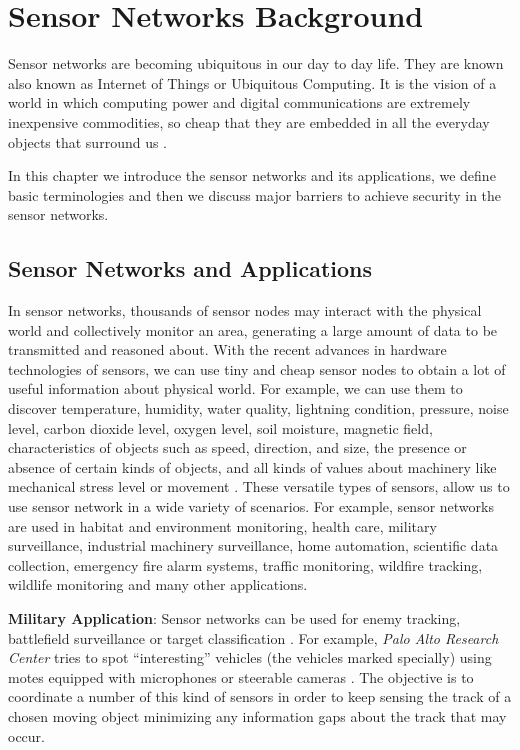 \chapter{Sensor Networks Background} 
\label{cha:Sensor Networks/Data Aggregation/Security Background}
	
	Sensor networks are becoming ubiquitous in our day to day life. 
	They are known also known as Internet of Things or Ubiquitous Computing.
	It is the vision of a world in which computing power and digital communications are extremely inexpensive commodities, so cheap that they are embedded in all the everyday objects that surround us \cite{2002-Stajano-ubiquitous}.
	
	In this chapter we introduce the sensor networks and its applications, we define basic terminologies and then we discuss major 
	barriers to achieve security in the sensor networks.

\section{Sensor Networks and Applications}
	In sensor networks, thousands of sensor nodes may interact with the physical world and collectively monitor an area, generating a large amount of data to be transmitted and reasoned about.
	With the recent advances in hardware technologies of sensors, we can use tiny and cheap sensor nodes to obtain a lot of useful information about physical world.
	For example, we can use them to discover temperature, humidity, water quality, lightning condition, pressure, noise level, carbon dioxide level, oxygen level, soil moisture, magnetic field, characteristics of objects such as speed, direction, and size, the presence or absence of certain kinds of objects, and all kinds of values about machinery like mechanical stress level or movement \cite{hof2007applications}.
	These versatile types of sensors, allow us to use sensor network in a wide variety of scenarios.
	For example, sensor networks are used in habitat and environment monitoring, health care, military surveillance, industrial machinery surveillance, home automation, scientific data collection, emergency fire alarm systems, traffic monitoring, wildfire tracking, wildlife monitoring and many other applications.
	
	\textbf{Military Application}: 
		Sensor networks can be used for enemy tracking, battlefield surveillance or target classification \cite{li2002detection}.
		For example, \textit{Palo Alto Research Center} tries to spot ``interesting'' vehicles (the vehicles marked specially) using motes equipped with microphones or steerable cameras \cite{chu2004distributed}.
		The objective is to coordinate a number of this kind of sensors in order to keep sensing the track of a chosen moving object minimizing any information gaps about the track that may occur.
	
